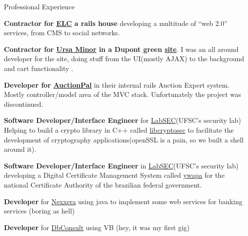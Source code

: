 \begin{rubric}{Professional Experience} 

    \entry*[2007 - 2008]%
        \textbf{Contractor for \href{http://www.elctech.com}{ELC} a rails house} 
        developing a multitude of ``web 2.0'' services, from CMS to social networks.

    \entry*[2007]%
        \textbf{Contractor for \href{http://ursaminor.com/}{Ursa Minor} 
        in a Dupont green \href{http://www.liveneutraldupont.org/dupont}{site}}.
        I was an all around developer for the site, doing stuff from the
        UI(mostly AJAX) to the background and cart functionality .

    \entry*[2007]%
        \textbf{Developer for \href{http://www.auctionpal.com/}{AuctionPal}} 
        in their internal rails Auction Expert system. Mostly controller/model area of
        the MVC stack. Unfortunately the project was discontinued.

    \entry*[2005 - 2007]%
        \textbf{Software Developer/Interface Engineer} for 
        \href{http://www.labsec.ufsc.br}{LabSEC}(UFSC's security lab) Helping
        to build a crypto library in C++ called \href{http://projetos.labsec.ufsc.br/libcryptosec}{libcryptosec} 
        to facilitate the development of cryptography
        applications(openSSL is a pain, so we built a shell around it).

    \entry*[2005 - 2007]%
        \textbf{Software Developer/Interface Engineer} in 
        \href{http://www.labsec.ufsc.br}{LabSEC}(UFSC's security lab) developing a
        Digital Certificate Management System  called
        \href{http://projetos.labsec.ufsc.br/ywapa}{ywapa} for the national
        Certificate Authority of the brazilian federal government.

    \entry*[2004 - 2005]%
        \textbf{Developer} for \href{http://www.nexxera.com.br}{Nexxera} 
        using java to implement some web services for banking services (boring as
        hell)

    \entry*[2003 - 2004]%
        \textbf{Developer} for \href{http://www.dbconsult.inf.br}{DbConsult} using VB 
        (hey, it was my first gig)

\end{rubric}
